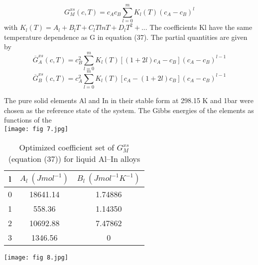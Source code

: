 \documentclass[12pt]{article}
\newcommand*{\1}{\hspace{1pt}}
\begin{document}
        \begin{equation}
            G^{xs}_M{(c, T)} = c _Ac _B\sum_{l = 0}^{m} K _l{(T)}(c_A - c _B)^l   
        \end{equation}
    with $ K_l (T ) = A _l + B_l T + C_l T ln T + D_l T^{2} + ...$ The coefficients Kl have the same
    temperature dependence as G in equation (37). The partial
    quantities are given by \\

        \begin{equation}
            \overline{G}^{xs}_A{(c, T)} = c _B^{2}\sum_{l = 0}^{m} K _l{(T)}[(1 + 2l)c_A - c _B](c_A - c _B)^{l-1}  
        \end{equation}
        \begin{equation}
            \overline{G}^{xs}_B{(c, T)} = c _A^{2}\sum_{l = 0}
            ^{m} K _l{(T)}[c_A - (1 + 2l)c _B](c_A - c _B)^{l-1}  
        \end{equation}

    The pure solid elements Al and In in their stable form at 298.15 K 
    and 1bar were chosen as the reference state of the system. 
    The Gibbs energies of the elements as functions of the \\

    \begin{adjustbox}{center,caption={calculated phase diagram 
        (continuous curve) using the coefficient set given in 
        table 2.
        },label={somelabel},nofloat=figure,vspace=\bigskipamount}
        \texttt{[image: fig 7.jpg]}
    \end{adjustbox}
    \begin{table}[t!]
        \centering
        \caption{Optimized coefficient set of $G ^ {xs} _ {M}$ 
        (equation (37)) for liquid Al–In alloys}
        \begin{tabular}{|c c c|} 
        \hline
        l & $A_l \ (J mol^{-1})$ & $B_l \ (J mol^{-1}K^{-1})$ \\ [0.5ex] 
        \hline\hline
        0 & 18641.14 & 1.74886  \\ 
        1 & 558.36 & 1.14350  \\
        2 & 10692.88 & 7.47862  \\
        3 & 1346.56 & 0 \\ [1ex] 
        \hline
        \end{tabular}
        \end{table}
    \begin{adjustbox}{center,caption={Calculated enthalpy of mixing 
        (continuous curve) using the coefficient set given in
        table 2.},label={somelabel},nofloat=figure,vspace=\bigskipamount}
        \texttt{[image: fig 8.jpg]}
    \end{adjustbox}
\end{document}
